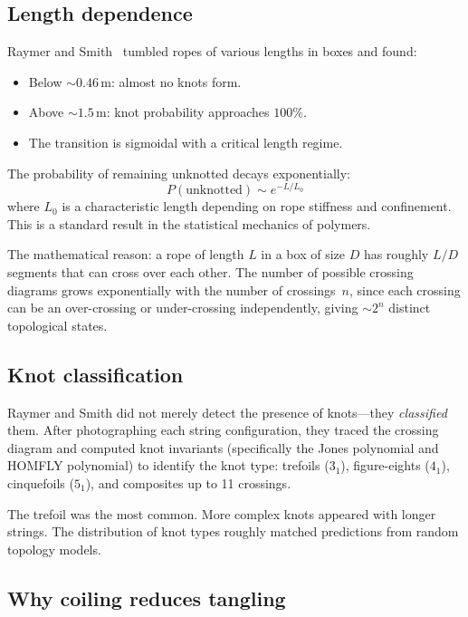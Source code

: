 \documentclass[12pt]{article}
\begin{document}
\subsection{Length dependence}

Raymer and Smith~\cite{RaymerSmith2007} tumbled ropes of various lengths
in boxes and found:
\begin{itemize}
  \item Below ${\sim}0.46\,\text{m}$: almost no knots form.
  \item Above ${\sim}1.5\,\text{m}$: knot probability approaches $100\%$.
  \item The transition is sigmoidal with a critical length regime.
\end{itemize}
The probability of remaining unknotted decays exponentially:
\[
  P(\text{unknotted}) \sim e^{-L/L_0}
\]
where $L_0$ is a characteristic length depending on rope stiffness and
confinement. This is a standard result in the statistical mechanics of
polymers.

The mathematical reason: a rope of length $L$ in a box of size $D$
has roughly $L/D$ segments that can cross over each other. The number of
possible crossing diagrams grows exponentially with the number of
crossings~$n$, since each crossing can be an over-crossing or
under-crossing independently, giving $\sim 2^n$ distinct topological states.

\subsection{Knot classification}

Raymer and Smith did not merely detect the presence of knots---they
\emph{classified} them. After photographing each string configuration,
they traced the crossing diagram and computed knot invariants (specifically
the Jones polynomial and HOMFLY polynomial) to identify the knot type:
trefoils ($3_1$), figure-eights ($4_1$), cinquefoils ($5_1$), and composites
up to 11 crossings.

The trefoil was the most common. More complex knots appeared with longer
strings. The distribution of knot types roughly matched predictions from
random topology models.

\subsection{Why coiling reduces tangling}
\end{document}
